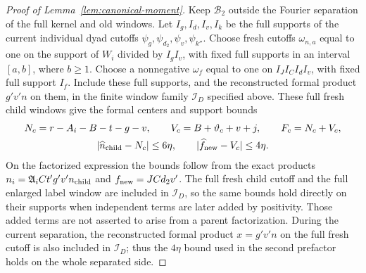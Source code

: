 \documentclass[12pt]{article}
\begin{document}
\begin{proof}[Proof of Lemma~\ref{lem:canonical-moment}]
Keep \(\mathcal B_2\) outside the Fourier separation of the full kernel
and old windows. Let \(I_g,I_d,I_v,I_k\) be the full supports of the
current individual dyad cutoffs \(\psi_g,\psi_{d_2},\psi_v,\psi_{k''}\).
Choose fresh cutoffs \(\omega_{n,a}\) equal to one on the support of
\(W_i\) divided by \(I_gI_v\), with fixed full supports in an interval
\([a,b]\), where \(b\ge1\). Choose a nonnegative \(\omega_f\) equal to
one on \(I_JI_CI_dI_v\), with fixed full support \(I_f\). Include these
full supports, and the reconstructed formal product \(g'v'n\) on them,
in the finite window family \(\mathcal I_D\) specified above.
These full fresh child windows give the formal centers and support bounds
\begin{equation}\label{eq:canonical-child-lengths}
 \begin{gathered}
 N_c=r-A_i-B-t-g-v,\qquad V_c=B+\vartheta_c+v+j,\qquad F_c=N_c+V_c,\\
 |\widehat n_{\rm child}-N_c|\le6\eta,\qquad
 |\widehat f_{\rm new}-V_c|\le4\eta.
 \end{gathered}
\end{equation}
On the factorized expression the bounds follow from the exact products
\(n_i=\mathfrak A_iCt'g'v'n_{\rm child}\) and
\(f_{\rm new}=JCd_2v'\).  The full fresh child cutoff and the full enlarged
label window are included in \(\mathcal I_D\), so the same bounds hold
directly on their supports when independent terms are later added by
positivity.  Those added terms are not asserted to arise from a parent
factorization.  During the current separation, the reconstructed formal
product \(x=g'v'n\) on the full fresh cutoff is also included in
\(\mathcal I_D\); thus the \(4\eta\) bound used in the second prefactor
holds on the whole separated side.


\end{proof}
\end{document}

